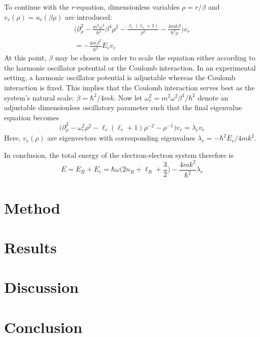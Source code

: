 \documentclass[reprint,english]{revtex4-1}
\begin{document}
To continue with the \(r\)-equation, dimensionless variables \(\rho=r/\beta\) and \(v_r(\rho)=u_r(\beta\rho)\) are introduced:
\begin{align*}
\bigg(\partial_\rho^2-\frac{m^2\omega^2}{\hbar^2}\beta^4\rho^2-\frac{\ell_r(\ell_r+1)}{\rho^2}-\frac{4mk\beta}{\hbar^2\rho}\bigg)v_r\\=-\frac{4m\beta^2}{\hbar^2}E_rv_r
\end{align*}
At this point, \(\beta\) may be chosen in order to scale the equation either according to the harmonic oscillator potential or the Coulomb interaction. In an experimental setting, a harmonic oscillator potential is adjustable whereas the Coulomb interaction is fixed. This implies that the Coulomb interaction serves best as the system's natural scale: \(\beta=\hbar^2/4mk\). Now let \(\omega_r^2=m^2\omega^2\beta^4/\hbar^2\) denote an adjustable dimensionless oscillatory parameter such that the final eigenvalue equation becomes
\begin{equation}\Big(\partial_\rho^2-\omega_r^2\rho^2-\ell_r(\ell_r+1)\rho^{-2}-\rho^{-1}\Big)v_r=\lambda_rv_r
\end{equation}
Here, \(v_r(\rho)\) are eigenvectors with corresponding eigenvalues \(\lambda_r=-\hbar^2E_r/4mk^2\).

In conclusion, the total energy of the electron-electron system therefore is
\begin{equation}
E=E_R+E_r=\hbar\omega\bigg(2n_R+\ell_R+\frac{3}{2}\bigg)-\frac{4mk^2}{\hbar^2}\lambda_r
\end{equation}







\clearpage

\section{Method}


\section{Results}


\section{Discussion}


\section{Conclusion}


\nocite{lecture_ode}\nocite{lecture_linalg}


\end{document}
